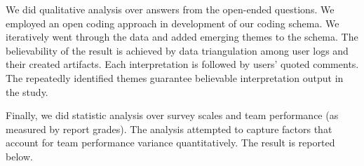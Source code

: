 We did qualitative analysis over answers from the open-ended questions. We employed an open coding approach in development of our coding schema. We iteratively went through the data and added emerging themes to the schema. The believability of the result is achieved by data triangulation among user logs and their created artifacts. Each interpretation is followed by users’ quoted comments. The repeatedly identified themes guarantee believable interpretation output in the study. 

Finally, we did statistic analysis over survey scales and team performance (as measured by report grades). The analysis attempted to capture factors that account for team performance variance quantitatively. The result is reported below.
